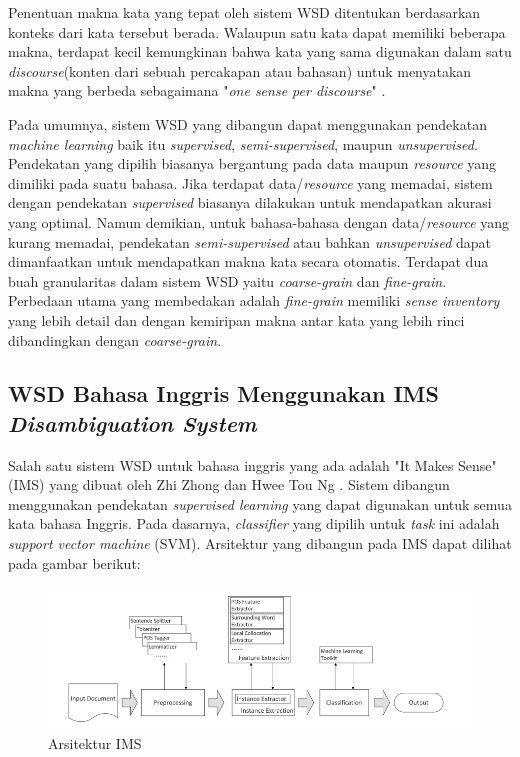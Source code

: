 Penentuan makna kata yang tepat oleh sistem WSD ditentukan berdasarkan konteks dari kata tersebut berada. Walaupun satu kata dapat memiliki beberapa makna, terdapat kecil kemungkinan bahwa kata yang sama digunakan dalam satu \textit{discourse}(konten dari sebuah percakapan atau bahasan) untuk menyatakan makna yang berbeda sebagaimana "\textit{one sense per discourse}" \citep{gale1992one}.

Pada umumnya, sistem WSD yang dibangun dapat menggunakan pendekatan \textit{machine learning} baik itu \textit{supervised}, \textit{semi-supervised}, maupun \textit{unsupervised}. Pendekatan yang dipilih biasanya bergantung pada data maupun \textit{resource} yang dimiliki pada suatu bahasa. Jika terdapat data/\textit{resource} yang memadai, sistem dengan pendekatan \textit{supervised} biasanya dilakukan untuk mendapatkan akurasi yang optimal. Namun demikian, untuk bahasa-bahasa dengan data/\textit{resource} yang kurang memadai, pendekatan \textit{semi-supervised} atau bahkan \textit{unsupervised} dapat dimanfaatkan untuk mendapatkan makna kata secara otomatis. Terdapat dua buah granularitas dalam sistem WSD yaitu \textit{coarse-grain} dan \textit{fine-grain}. Perbedaan utama yang membedakan adalah \textit{fine-grain} memiliki \textit{sense inventory} yang lebih detail dan dengan kemiripan makna antar kata yang lebih rinci dibandingkan dengan \textit{coarse-grain}.

\subsection{WSD Bahasa Inggris Menggunakan IMS \textit{Disambiguation System}}
Salah satu sistem WSD untuk bahasa inggris yang ada adalah "It Makes Sense" (IMS) yang dibuat oleh Zhi Zhong dan Hwee Tou Ng \citep{zhong2010makes}. Sistem  dibangun menggunakan pendekatan \textit{supervised learning} yang dapat digunakan untuk semua kata bahasa Inggris. Pada dasarnya, \textit{classifier} yang dipilih untuk \textit{task} ini adalah \textit{support vector machine} (SVM). Arsitektur yang dibangun pada IMS dapat dilihat pada gambar berikut:

\begin{figure}
	\centering
	\includegraphics[width=1\linewidth]{adit_pics/Arsitektur-IMS}
	\caption{Arsitektur IMS}
	\label{fig:Arsitektur-IMS}
\end{figure}

